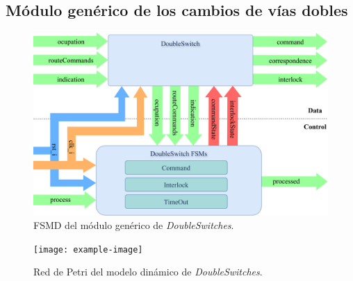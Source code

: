 \subsection{Módulo genérico de los cambios de vías dobles}

\lipsum[1]

\begin{figure}[H]
	\centering
	\includegraphics[width=1\textwidth]{Figuras/DSW_module}
	\centering\caption{FSMD del módulo genérico de \textit{DoubleSwitches}.}
	\label{fig:DSW_module}
\end{figure}

\lipsum[1]

\begin{figure}[H]
	\centering
	\texttt{[image: example-image]}
	\centering\caption{Red de Petri del modelo dinámico de \textit{DoubleSwitches}.}
	\label{fig:DSW_Petri}
\end{figure}

\lipsum[1]
